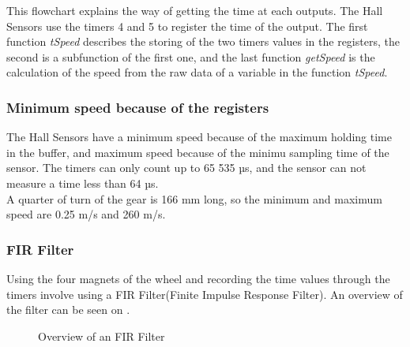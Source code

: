 This flowchart explains the way of getting the time at each outputs. The Hall Sensors use the timers 4 and 5 to register the time of the output. The first function \textit{tSpeed} describes the storing of the two timers values in the registers, the second is a subfunction of the first one, and the last function \textit{getSpeed} is the calculation of the speed from the raw data of a variable in the function \textit{tSpeed}.\\


\subsubsection{Minimum speed because of the registers}

The Hall Sensors have a minimum speed because of the maximum holding time in the buffer, and maximum speed because of the minimu sampling time of the sensor. The timers can only count up to 65 535 µs, and the sensor can not measure a time less than 64 µs. \\
A quarter of turn of the gear is 166 mm long, so the minimum and maximum speed are 0.25 m/s and 260 m/s.	



\subsubsection{FIR Filter}

Using the four magnets of the wheel and recording the time values through the timers involve using a  FIR Filter(Finite Impulse Response Filter). An overview of the filter can be seen on .


\begin{figure}[H]
	\centering
	\caption{Overview of an FIR Filter}
	\label{FIRFilter}
\end{figure}